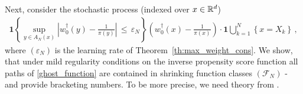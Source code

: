 Next, consider the stochastic process (indexed over $x\in\mathbb{R}^d$)
\begin{gather}
  \label{ghost_function}
  \mathbf{1}{
    \left\{ 
      \sup_{y\in A_N(x)}
      \left| 
      w_0^\dagger(y)
      -
      \frac{1}{\pi(y)}
      \right|
      \,
      \le
      \,
      \varepsilon_N
    \right\}
  }
  \left( 
    w_0^\dagger(x)
      -
      \frac{1}{\pi(x)}
  \right)
  \cdot
  \mathbf{1}
  \bigcup_{k=1}^N
  \left\{ 
    x=X_k
  \right\}
  \,,
\end{gather}
where $(\varepsilon_N)$ is the learning rate of Theorem~\ref{th:max_weight_cons}.
We show, 
that under mild regularity conditions on the inverse propensity score function all paths of \eqref{ghost_function} are contained in shrinking function classes $(\mathcal{F}_N)$ - and provide bracketing numbers. 
To be more precise, we need theory from \cite[§2.7.1]{vaart2013}.

